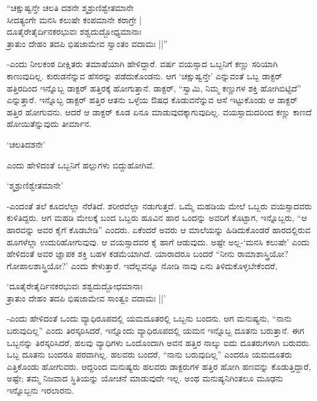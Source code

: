 \begin{shloka}
``ಚಕ್ಷುಷ್ವನ್ತೇ ಚಲತಿ ದಶನೇ ಶ್ಮಶ್ರುಣಿಶ್ವೇತಮಾನೇ\\
ಸೀದತ್ಯಂಗೇ ಮನಸಿ ಕಲುಷೇ ಕಂಪಮಾನೇ ಕರಾಗ್ರೇ |\\
ದೂತೈರೇತೈರ್ದಿನಕರಭುವಃ ಶಶ್ವದುದ್ಬೋಧ್ಯಮಾನಾಃ\\
ತ್ರಾತುಂ ದೇಹಂ ತದಪಿ ಭಿಷಜಾಮೇವ ಸ್ವಾಂತಂ ವದಾಮಃ ||''
\end{shloka}

-ಎಂದು ನೀಲಕಂಠ ದೀಕ್ಷಿತರು ತಮಾಷೆಯಾಗಿ ಹೇಳಿದ್ದಾರೆ. {}ವರ್ಷ ವಯಸ್ಸಾದ ಒಬ್ಬನಿಗೆ ಕಣ್ಣು ಸರಿಯಾಗಿ ಕಾಣುವುದಿಲ್ಲ. ಕುರುಡನೆನ್ನುವ ಹೆಸರನ್ನು ಪಡೆದುಕೊಂಡನು. ಆಗ `ಚಕ್ಷುಷ್ವನ್ತೇ' ಎನ್ನುವಂತೆ ಒಬ್ಬ ಡಾಕ್ಟರ್ ಹತ್ತಿರದಿಂದ ಇನ್ನೊಬ್ಬ ಡಾಕ್ಟರ್ ಹತ್ತಿರಕ್ಕೆ ಹೋಗುತ್ತಾನೆ. ಡಾಕ್ಟರ್, ``ಸ್ವಾಮಿ, ನಿಮ್ಮ ಕಣ್ಣುಗಳ ಶಕ್ತಿ ಹೋಗಿಬಿಟ್ಟಿದೆ'' ಎನ್ನುತ್ತಾರೆ. ಇನ್ನೊಬ್ಬ ಡಾಕ್ಟರ್ ಹತ್ತಿರ ಆತನು ಒಳ್ಳೆಯ ಔಷಧ ಕೊಡುವನೆನ್ನುವ ಆಸೆ ಇಟ್ಟುಕೊಂಡು ಆ ಡಾಕ್ಟರ್ ಹತ್ತಿರ ಹೋಗುವನು. ಆದರೆ ಆ ಡಾಕ್ಟರ್ ಕೂಡ ಏನೂ ಮಾಡುವುದಕ್ಕಾಗುವುದಿಲ್ಲ. ವಯಸ್ಸಾದುದರಿಂದ ಕಣ್ಣು ಕಾಣದೆ ಹೋಯಿತೆನ್ನುವುದು ತೀರ್ಮಾನ.

`ಚಲತಿದಶನೇ'

ಎಂದು ಹೇಳಿದಂತೆ ಒಬ್ಬನಿಗೆ ಹಲ್ಲುಗಳು ಬಿದ್ದುಹೋಗಿವೆ.

\begin{shloka}
`ಶ್ಮಶ್ರುಣಿಶ್ವೇತಮಾನೇ'
\end{shloka}

-ಎಂದಂತೆ ತಲೆ ಕೂದಲೆಲ್ಲಾ ನೆರೆತಿದೆ. ಶರೀರವೆಲ್ಲಾ ನಡುಗುತ್ತದೆ. ಒಮ್ಮೆ ಮಹಡಿಯ ಮೇಲೆ ಒಬ್ಬರು ವಯಸ್ಸಾದವರು ಕುಳಿತಿದ್ದರು. ಆಗ ಮಹಡಿ ಮೇಲಕ್ಕೆ ಬಂದ ಒಬ್ಬರು ಹೂವಿನ ಹಾರ ಒಂದನ್ನು ಅವರಿಗೆ ಕೊಟ್ಟಾಗ, ಇನ್ನೊಬ್ಬರು, ``ಆ ಹಾರವನ್ನು ಅವರ ಕೈಗೆ ಕೊಡಬೇಡಿ'' ಎಂದರು. ಏಕೆಂದರೆ ಅವರು ಆ ಮಾಲೆಯನ್ನು ಹಿಡಿದುಕೊಂಡರೆ ಹಾರದಲ್ಲಿರುವ ಹೂಗಳೆಲ್ಲಾ ಉದುರಿಹೋಗುವುವು. ಆ ವಯಸ್ಸಾದವರ ಕೈ ಹಾಗೆ ಆಡುವುದು. ಅಷ್ಟೇ ಅಲ್ಲ-`ಮನಸಿ ಕಲುಷೇ' ಎಂದು ಹೇಳಿದಂತೆ ಅವರ ಜ್ಞಾಪಕ ಶಕ್ತಿ ಬಹಳ ಕಡಮೆಯಾಗಿದೆ. ಯಾರಾದರೂ ಬಂದರೆ ``ನೀನು ರಾಮಾಶಾಸ್ತ್ರಿಯೋ? ಗೋಪಾಲಶಾಸ್ತ್ರಿಯೋ?' ಎಂದು ಕೇಳುತ್ತಾರೆ. ಇದೆಲ್ಲವನ್ನೂ ನೋಡಿ ನಾವು ಏನು ತಿಳಿದುಕೊಳ್ಳಬೇಕೆಂದರೆ,

\begin{shloka}
`ದೂತೈರೇತೈರ್ದಿನಕರಭುವಃ ಶಶ್ವದುದ್ಬೋಧಮಾನಾಃ\\
ತ್ರಾತುಂ ದೇಹಂ ತದಪಿ ಭಿಷಜಾಮೇವ ಸಾಂತ್ವಂ ವದಾಮಃ ||'
\end{shloka}

-ಎಂದು ಹೇಳಿದಂತೆ ಒಂದು ವ್ಯಾಧಿರೂಪದಲ್ಲಿ ಯಮದೂತರಲ್ಲಿ ಒಬ್ಬನು ಬಂದನು. ಆಗ ಮನುಷ್ಯನು, ``ನಾನು ಬರುವುದಿಲ್ಲ'' ಎಂದು ತಿರಸ್ಕರಿಸಿದರೆ, ಇನ್ನೊಂದು ವ್ಯಾಧಿರೂಪದಲ್ಲಿ ಯಮನ ಇನ್ನೊಬ್ಬ ದೂತನು ಬರುತ್ತಾನೆ. ಈಗ ಒಬ್ಬನನ್ನು ತಿರಸ್ಕರಿಸಿದರೆ, ಹಲವು ವ್ಯಾಧಿಗಳು ಒಂದೊಂದಾಗಿ ಅವನ ಹತ್ತಿರ ನಾಲ್ಕು ಐದು ದೂತರುಗಳಾಗಿ ಬರುವರು. ಒಬ್ಬ ದೂತನು ಬಂದರೂ ಪರವಾಗಿಲ್ಲ. ಹಲವರು ಬಂದರೆ, ``ನಾನು ಬರುವುದಿಲ್ಲ'' ಎಂದರೂ ಯಮದೂತರು ಎತ್ತಿಕೊಂಡು ಹೋಗುವರು. ಆದ್ದರಿಂದ ಮನುಷ್ಯರು ಹಲವರು ಡಾಕ್ಟರುಗಳ ಹತ್ತಿರ ಹೋಗಿ ಹಣವನ್ನು ಕೊಡುತ್ತಿದ್ದಾರೆ, ಅಷ್ಟೇ; ತಮ್ಮ ನಿಜವಾದ ಸ್ಥಿತಿಯನ್ನು ಯೋಚನೆ ಮಾಡುವುದೇ ಇಲ್ಲ. ಅಂಥ ಮನುಷ್ಯನಿಗಿಂತಲೂ ಮೂಢನು ಇನ್ನೊಬ್ಬನು ಇರಲಾರನು.

